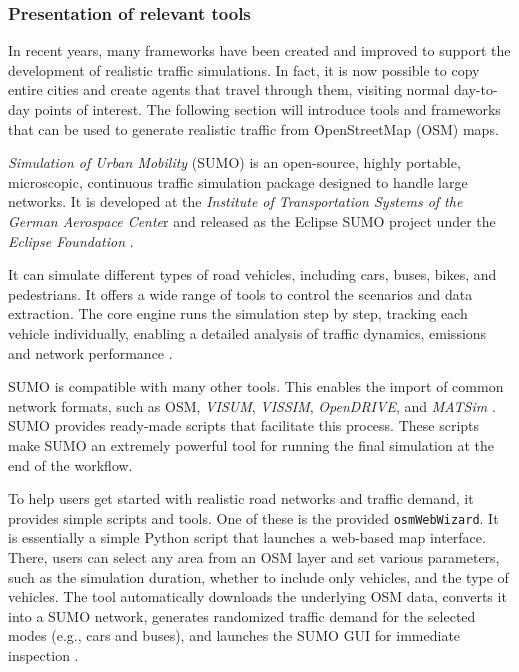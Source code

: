 \subsubsection{Presentation of relevant tools}
In recent years, many frameworks have been created and improved to support the development of realistic traffic simulations. In fact, it is now possible to copy entire cities and create agents that travel through them, visiting normal day-to-day points of interest. The following section will introduce tools and frameworks that can be used to generate realistic traffic from OpenStreetMap (OSM) maps.

\textit{Simulation of Urban Mobility} (SUMO) is an open-source, highly portable, microscopic, continuous traffic simulation package designed to handle large networks. It is developed at the \textit{Institute of Transportation Systems of the German Aerospace Cente}r and released as the Eclipse SUMO project under the \textit{Eclipse Foundation} \cite{noauthor_sumo_nodate, noauthor_eclipse_nodate}.

It can simulate different types of road vehicles, including  cars, buses, bikes, and pedestrians. It offers a wide range of tools to control the scenarios and data extraction. The core engine runs the simulation step by step, tracking each vehicle individually, enabling a detailed analysis of traffic dynamics, emissions and network performance \cite{noauthor_eclipse_nodate}.

SUMO is compatible with many other tools. This enables the import of common network formats, such as OSM, \textit{VISUM}, \textit{VISSIM}, \textit{OpenDRIVE}, and \textit{MATSim} \cite{noauthor_eclipse_nodate}. SUMO provides ready-made scripts that facilitate this process. These scripts make SUMO an extremely powerful tool for running the final simulation at the end of the workflow.

To help users get started with realistic road networks and traffic demand, it provides simple scripts and tools. One of these is the provided \texttt{osmWebWizard}. It is essentially a simple Python script that launches a web-based map interface. There, users can select any area from an OSM layer and set various parameters, such as the simulation duration, whether to include only vehicles, and the type of vehicles.  The tool automatically downloads the underlying OSM data, converts it into a SUMO network, generates randomized traffic demand for the selected modes (e.g., cars and buses), and launches the SUMO GUI for immediate inspection \cite{noauthor_osmwebwizard_nodate}.

